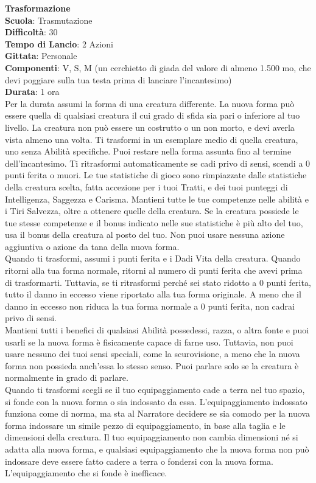 \begin{multicols}{2}
\medskip\textbf{Trasformazione}\\
\textbf{Scuola}: Trasmutazione\\
\textbf{Difficoltà}:  30\\
\textbf{Tempo di Lancio}: 2 Azioni\\
\textbf{Gittata}: Personale\\
\textbf{Componenti}: V, S, M (un cerchietto di giada del valore di almeno 1.500 mo, che devi poggiare sulla tua testa prima di lanciare l'incantesimo)\\
\textbf{Durata}: 1 ora\\
Per la durata assumi la forma di una creatura differente. La nuova forma può essere quella di qualsiasi creatura il cui grado di sfida sia pari o inferiore al tuo livello. La  creatura non può essere un costrutto o un non morto, e devi averla vista almeno una volta. Ti trasformi in un esemplare medio di quella creatura, uno senza Abilità specifiche. Puoi restare nella forma assunta fino al termine dell'incantesimo. Ti ritrasformi automaticamente se cadi privo di sensi, scendi a 0 punti ferita o muori. Le tue statistiche di gioco sono rimpiazzate dalle statistiche della creatura scelta, fatta accezione per i tuoi Tratti, e dei tuoi punteggi di Intelligenza, Saggezza e Carisma. Mantieni tutte le tue competenze nelle abilità e i Tiri Salvezza, oltre a ottenere quelle della creatura. Se la creatura possiede le tue stesse competenze e il bonus indicato nelle sue statistiche è più alto del tuo, usa il bonus della creatura al posto del tuo. Non puoi usare nessuna azione aggiuntiva o azione da tana della nuova forma.\\
Quando ti trasformi, assumi i punti ferita e i Dadi Vita della creatura. Quando ritorni alla tua forma normale, ritorni al numero di punti ferita che avevi prima di trasformarti. Tuttavia, se ti ritrasformi perché sei stato ridotto a 0 punti ferita, tutto il danno in eccesso viene riportato alla tua forma originale. A meno che il danno in eccesso non riduca la tua forma normale a 0 punti ferita, non cadrai privo di sensi. \\
Mantieni tutti i benefici di qualsiasi Abilità possedessi, razza, o altra fonte e puoi usarli se la nuova forma è fisicamente capace di farne uso. Tuttavia, non puoi usare nessuno dei tuoi sensi speciali, come la scurovisione, a meno che la nuova forma non possieda anch'essa lo stesso senso. Puoi parlare solo se la creatura è normalmente in grado di parlare.\\
Quando ti trasformi scegli se il tuo equipaggiamento cade a terra nel tuo spazio, si fonde con la nuova forma o sia indossato da essa. L'equipaggiamento indossato funziona come di norma, ma sta al Narratore decidere se sia comodo per la nuova forma indossare un simile pezzo di equipaggiamento, in base alla taglia e le dimensioni della creatura. Il tuo equipaggiamento non cambia dimensioni né si adatta alla nuova forma, e qualsiasi equipaggiamento che la nuova forma non può indossare deve essere fatto cadere a terra o fondersi con la nuova forma. L'equipaggiamento che si fonde è inefficace.\\

\end{multicols}

